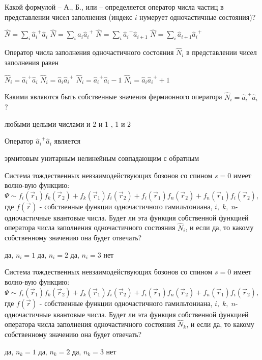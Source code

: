 \documentclass[11pt,a4paper]{exam}
\begin{document}
\begin{questions}
\question Какой формулой – А., Б., или – определяется оператор числа частиц в представлении чисел заполнения (индекс $i$ нумерует одночастичные состояния)? 
\begin{choices}
\choice $\hat N = \sum\limits_i {{{\hat a}_i}^ + } {\hat a_i}$   
\choice $\hat N = \sum\limits_i {{{\hat a}_i}{{\hat a}_i}^ + } $ 
\choice $\hat N = \sum\limits_i {{{\hat a}_i}^ + } {\hat a_{i + 1}}$   
\choice $\hat N = \sum\limits_i {{{\hat a}_{i + 1}}{{\hat a}_i}^ + } $
\end{choices}

\question Оператор числа заполнения одночастичного состояния ${\hat N_i}$ в представлении чисел заполнения равен
\begin{choices}
\choice ${\hat N_i} = {\hat a_i}^ + {\hat a_i}$      
\choice ${\hat N_i} = {\hat a_i}{\hat a_i}^ + $      
\choice ${\hat N_i} = {\hat a_i}^ + {\hat a_i} - 1$  
\choice ${\hat N_i} = {\hat a_i}{\hat a_i}^ +  + 1$
\end{choices}

\question Какими являются быть собственные значения фермионного оператора ${\hat N_i} = {\hat a_i}^ + {\hat a_i}$?
\begin{choices}
\choice любыми целыми числами
 и 2
 и 1
, 1 и 2
\end{choices}

\question Оператор ${\hat a_i}^ + {\hat a_i}$ является
\begin{choices}
\choice эрмитовым   
\choice унитарным      
\choice нелинейным  
\choice совпадающим с обратным 
\end{choices}

\question Система тождественных невзаимодействующих бозонов со спином $s = 0$ имеет волно-вую функцию: $\Psi  \sim {f_i}({\vec r_1}){f_k}({\vec r_2}) + {f_k}({\vec r_1}){f_i}({\vec r_2}) + {f_i}({\vec r_1}){f_n}({\vec r_2}) + {f_n}({\vec r_1}){f_i}({\vec r_2})$, где $f(\vec r)$ - собственные функции одночастичного гамильтониана, $i,\;k,\;n$- одночастичные квантовые числа. Будет ли эта функция собственной функцией оператора числа заполнения одночастичного состояния ${\hat N_i}$, и если да, то какому собственному значению она будет отвечать?
\begin{choices}
\choice да, ${n_i} = 1$      
\choice да, ${n_i} = 2$      
\choice да, ${n_i} = 3$      
\choice нет
\end{choices}

\question Система тождественных невзаимодействующих бозонов со спином $s = 0$ имеет волно-вую функцию: $\Psi  \sim {f_i}({\vec r_1}){f_k}({\vec r_2}) + {f_k}({\vec r_1}){f_i}({\vec r_2}) + {f_i}({\vec r_1}){f_n}({\vec r_2}) + {f_n}({\vec r_1}){f_i}({\vec r_2})$, где $f(\vec r)$ - собственные функции одночастичного гамильтониана, $i,\;k,\;n$- одночастичные квантовые числа. Будет ли эта функция собственной функцией оператора числа заполнения одночастичного состояния ${\hat N_k}$, и если да, то какому собственному значению она будет отвечать?
\begin{choices}
\choice да, ${n_k} = 1$      
\choice да, ${n_k} = 2$      
\choice да, ${n_k} = 3$      
\choice нет
\end{choices}


\end{questions}
\end{document}
